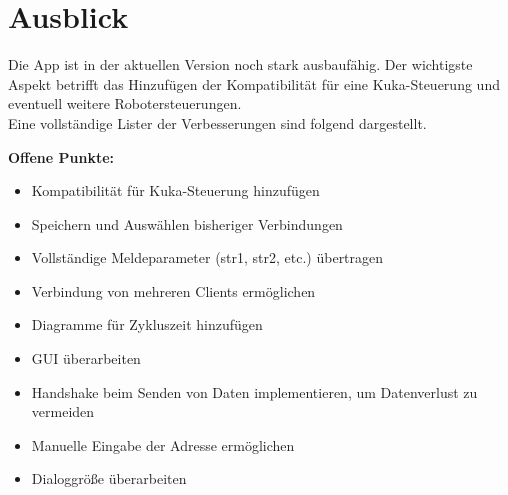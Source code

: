 \chapter{Ausblick}
\label{sec:Ausblick}
Die App ist in der aktuellen Version noch stark ausbaufähig. Der wichtigste 
Aspekt betrifft das Hinzufügen der Kompatibilität für eine Kuka-Steuerung und 
eventuell weitere Robotersteuerungen.\\
Eine vollständige Lister der Verbesserungen sind folgend dargestellt.

\textbf{Offene Punkte:}
\begin{itemize}
\item Kompatibilität für Kuka-Steuerung hinzufügen
\item Speichern und Auswählen bisheriger Verbindungen
\item Vollständige Meldeparameter (str1, str2, etc.) übertragen
\item Verbindung von mehreren Clients ermöglichen
\item Diagramme für Zykluszeit hinzufügen
\item GUI überarbeiten
\item Handshake beim Senden von Daten implementieren, um Datenverlust zu 
vermeiden
\item Manuelle Eingabe der Adresse ermöglichen
\item Dialoggröße überarbeiten
\end{itemize}